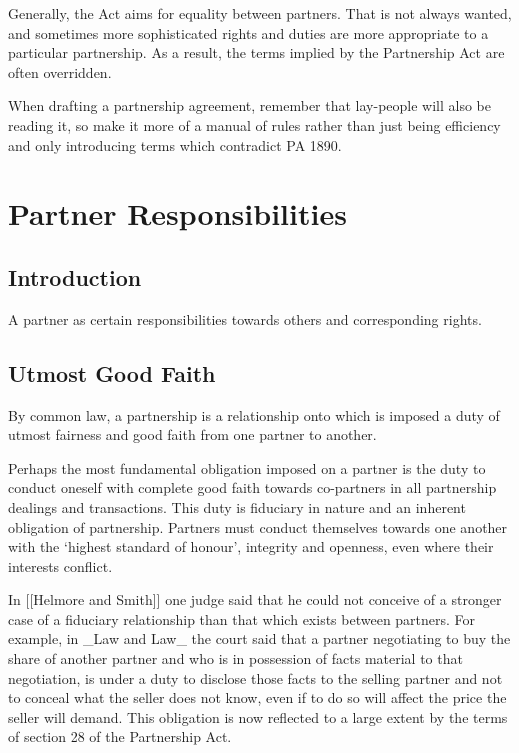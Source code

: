 \documentclass[
]{article}
\newenvironment{Shaded}{}{}
\newcommand{\NormalTok}[1]{#1}
\begin{document}
Generally, the Act aims for equality between partners. That is not
always wanted, and sometimes more sophisticated rights and duties are
more appropriate to a particular partnership. As a result, the terms
implied by the Partnership Act are often overridden.

When drafting a partnership agreement, remember that lay-people will
also be reading it, so make it more of a manual of rules rather than
just being efficiency and only introducing terms which contradict PA
1890.

\hypertarget{partner-responsibilities}{%
\section{Partner Responsibilities}\label{partner-responsibilities}}

\hypertarget{introduction-2}{%
\subsection{Introduction}\label{introduction-2}}

A partner as certain responsibilities towards others and corresponding
rights.

\hypertarget{utmost-good-faith}{%
\subsection{Utmost Good Faith}\label{utmost-good-faith}}

\begin{Shaded}
\begin{Highlighting}[]
\NormalTok{By common law, a partnership is a relationship onto which is imposed a duty of utmost fairness and good faith from one partner to another. }
\end{Highlighting}
\end{Shaded}

Perhaps the most fundamental obligation imposed on a partner is the duty
to conduct oneself with complete good faith towards co-partners in all
partnership dealings and transactions. This duty is fiduciary in nature
and an inherent obligation of partnership. Partners must conduct
themselves towards one another with the `highest standard of honour',
integrity and openness, even where their interests conflict.

\begin{Shaded}
\begin{Highlighting}[]
\NormalTok{In [[Helmore and Smith]] one judge said that he could not conceive of a stronger case of a fiduciary relationship than that which exists between partners. For example, in \_Law and Law\_ the court said that a partner negotiating to buy the share of another partner and who is in possession of facts material to that negotiation, is under a duty to disclose those facts to the selling partner and not to conceal what the seller does not know, even if to do so will affect the price the seller will demand. This obligation is now reflected to a large extent by the terms of section 28 of the Partnership Act.}
\end{Highlighting}
\end{Shaded}
\end{document}
